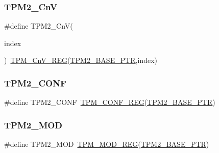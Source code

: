 \subsubsection{\texorpdfstring{T\+P\+M2\+\_\+\+CnV}{TPM2\_CnV}}
{\footnotesize\ttfamily \#define T\+P\+M2\+\_\+\+CnV(\begin{DoxyParamCaption}\item[{}]{index }\end{DoxyParamCaption})~\hyperlink{group___t_p_m___register___accessor___macros_gaf87163e32c337d1f46724110a85e8ea2}{T\+P\+M\+\_\+\+Cn\+V\+\_\+\+R\+EG}(\hyperlink{group___t_p_m___peripheral_ga37cc120e7475fb646fe9bc15b57f06bc}{T\+P\+M2\+\_\+\+B\+A\+S\+E\+\_\+\+P\+TR},index)}

\mbox{\label{group___t_p_m___register___accessor___macros_gafab7c79890c0e6013f06f7e71301fe41}} 
\subsubsection{\texorpdfstring{T\+P\+M2\+\_\+\+C\+O\+NF}{TPM2\_CONF}}
{\footnotesize\ttfamily \#define T\+P\+M2\+\_\+\+C\+O\+NF~\hyperlink{group___t_p_m___register___accessor___macros_ga6c809a9824dbb88125be858cc3f362fd}{T\+P\+M\+\_\+\+C\+O\+N\+F\+\_\+\+R\+EG}(\hyperlink{group___t_p_m___peripheral_ga37cc120e7475fb646fe9bc15b57f06bc}{T\+P\+M2\+\_\+\+B\+A\+S\+E\+\_\+\+P\+TR})}

\mbox{\label{group___t_p_m___register___accessor___macros_ga7f327677ecc786ac37de5525befbdd0d}} 
\subsubsection{\texorpdfstring{T\+P\+M2\+\_\+\+M\+OD}{TPM2\_MOD}}
{\footnotesize\ttfamily \#define T\+P\+M2\+\_\+\+M\+OD~\hyperlink{group___t_p_m___register___accessor___macros_ga549fa5a6fe75d15bb21ae1a3925047c7}{T\+P\+M\+\_\+\+M\+O\+D\+\_\+\+R\+EG}(\hyperlink{group___t_p_m___peripheral_ga37cc120e7475fb646fe9bc15b57f06bc}{T\+P\+M2\+\_\+\+B\+A\+S\+E\+\_\+\+P\+TR})}

